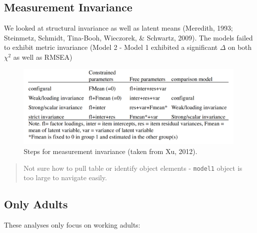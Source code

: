 \documentclass[
  english,
  man]{apa6}
\begin{document}
\hypertarget{measurement-invariance}{%
\subsection{Measurement Invariance}\label{measurement-invariance}}

We looked at structural invariance as well as latent means (Meredith, 1993; Steinmetz, Schmidt, Tina-Booh, Wieczorek, \& Schwartz, 2009). The models failed to exhibit metric invariance (Model 2 - Model 1 exhibited a significant \(\Delta\) on both \(\chi^2\) as well as RMSEA)

\begin{figure}
\includegraphics[width=4.71in]{steps} \caption{Steps for measurement invariance (taken from Xu, 2012).}\label{fig:figure1}
\end{figure}

\begin{quote}
Not sure how to pull table or identify object elements - \texttt{model1} object is too large to navigate easily.
\end{quote}

\hypertarget{only-adults}{%
\subsection{Only Adults}\label{only-adults}}

These analyses only focus on working adults:
\end{document}
